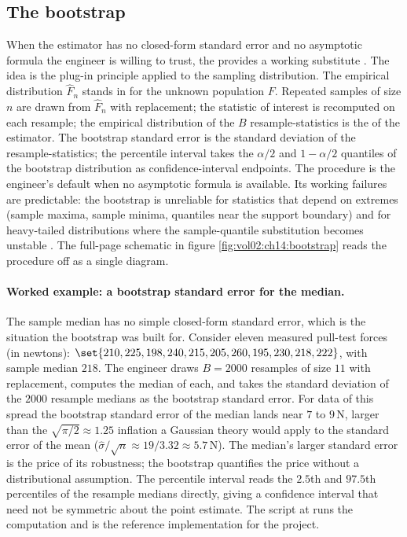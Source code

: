 \subsection{The bootstrap}

When the estimator has no closed-form standard error and no
asymptotic formula the engineer is willing to trust, the
 provides a working substitute
\cite{paper:v2ch14-efron-bootstrap-1979}. The idea is the
plug-in principle applied to the sampling distribution. The
empirical distribution $\hat{F}_{n}$ stands in for the unknown
population $F$. Repeated samples of size $n$ are drawn from
$\hat{F}_{n}$ with replacement; the statistic of interest is
recomputed on each resample; the empirical distribution of the
$B$ resample-statistics is the 
of the estimator. The bootstrap standard error is the standard
deviation of the resample-statistics; the percentile interval
takes the $\alpha/2$ and $1-\alpha/2$ quantiles of the bootstrap
distribution as confidence-interval endpoints. The procedure is
the engineer's default when no asymptotic formula is available.
Its working failures are predictable: the bootstrap is unreliable
for statistics that depend on extremes (sample maxima, sample
minima, quantiles near the support boundary) and for heavy-tailed
distributions where the sample-quantile substitution becomes
unstable \cite{paper:ch08-efron-tibshirani-1993}. The full-page
schematic in figure \ref{fig:vol02:ch14:bootstrap} reads the
procedure off as a single diagram.



\paragraph{Worked example: a bootstrap standard error for the
median.} The sample median has no simple closed-form standard
error, which is the situation the bootstrap was built for. Consider
eleven measured pull-test forces (in newtons): $\set{210, 225, 198,
240, 215, 205, 260, 195, 230, 218, 222}$, with sample median
$218$. The engineer draws $B = 2000$ resamples of size $11$ with
replacement, computes the median of each, and takes the standard
deviation of the $2000$ resample medians as the bootstrap standard
error. For data of this spread the bootstrap standard error of the
median lands near $7$ to $9\,$N, larger than the
$\sqrt{\pi/2} \approx 1.25$ inflation a Gaussian theory would apply
to the standard error of the mean ($\hat{\sigma}/\sqrt{n} \approx
19/3.32 \approx 5.7\,$N). The median's larger standard error is the
price of its robustness; the bootstrap quantifies the price without
a distributional assumption. The percentile interval reads the
$2.5$th and $97.5$th percentiles of the resample medians directly,
giving a confidence interval that need not be symmetric about the
point estimate. The script at
runs the computation and is the reference implementation for the
project.

